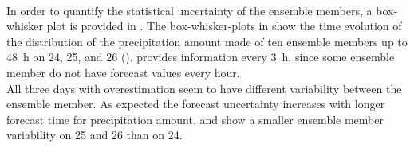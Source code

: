 \noindent
\\
In order to quantify the statistical uncertainty of the ensemble members, a box-whisker plot is provided in . The box-whisker-plots in  show the time evolution of the distribution of the precipitation amount made of ten ensemble members up to \SI{48}{\hour} on \num{24}, \num{25}, and \SI{26}{\dec} (). 
 provides information every \SI{3}{\hour}, since some ensemble member do not have forecast values every hour.
\\
All three days with overestimation seem to have different variability between the ensemble member. As expected the forecast uncertainty increases  with longer forecast time for precipitation amount.  and  show a smaller ensemble member variability on \num{25} and \SI{26}{\dec} than on \SI{24}{\dec}.
\\

